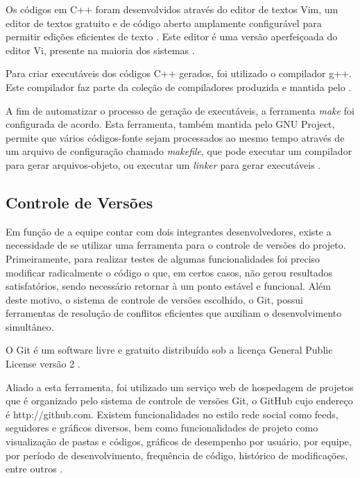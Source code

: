 Os códigos em C++ foram desenvolvidos através do editor de textos Vim, um editor de textos gratuito e de código aberto amplamente configurável para permitir edições eficientes de texto \cite{vimabout}. Este editor é uma versão aperfeiçoada do editor Vi, presente na maioria dos sistemas .

Para criar executáveis dos códigos C++ gerados, foi utilizado o compilador g++. Este compilador faz parte da coleção de compiladores  \cite{gccabout} produzida e mantida pelo  \cite{gnuabout}.

A fim de automatizar o processo de geração de executáveis, a ferramenta \emph{make} foi configurada de acordo. Esta ferramenta, também mantida pelo GNU Project, permite que vários códigos-fonte sejam processados ao mesmo tempo através de um arquivo de configuração chamado \emph{makefile}, que pode executar um compilador para gerar arquivos-objeto, ou executar um \emph{linker} para gerar executáveis \cite{makeabout}.
 
\subsection{Controle de Versões}

Em função de a equipe contar com dois integrantes desenvolvedores, existe a necessidade de se utilizar uma ferramenta para o controle de versões do projeto. Primeiramente, para realizar testes de algumas funcionalidades foi preciso modificar radicalmente o código o que, em certos casos, não gerou resultados satisfatórios, sendo necessário retornar à um ponto estável e funcional. Além deste motivo, o sistema de controle de versões escolhido, o Git, possui ferramentas de resolução de conflitos eficientes que auxiliam o desenvolvimento simultâneo.

O Git é um software livre e gratuito distribuído sob a licença  General Public License versão 2 \cite{git}.

Aliado a esta ferramenta, foi utilizado um serviço web de hospedagem de projetos que é organizado pelo sistema de controle de versões Git, o GitHub cujo endereço é http://github.com. Existem funcionalidades no estilo rede social como feeds, seguidores e gráficos diversos, bem como funcionalidades de projeto como visualização de pastas e códigos, gráficos de desempenho por usuário, por equipe, por período de desenvolvimento, frequência de código, histórico de modificações, entre outros \cite{githubabout}.

